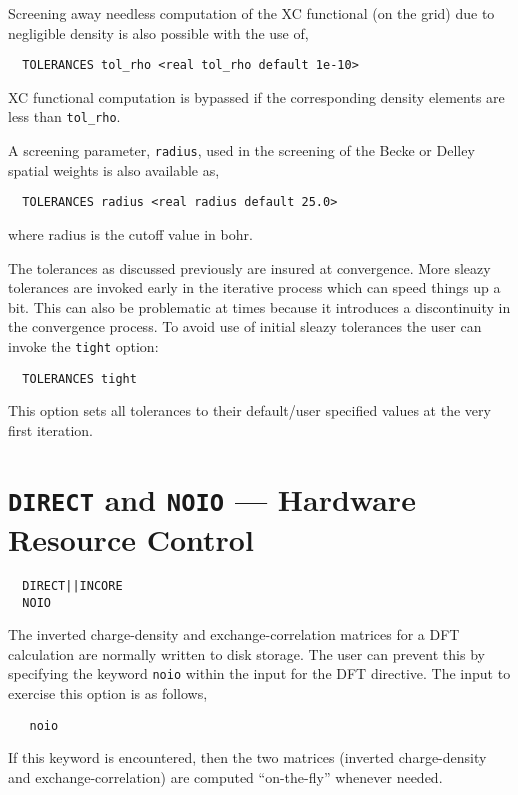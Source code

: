 
Screening away needless computation of the XC functional (on the grid)
due to negligible density is also possible with the use of,
\begin{verbatim}
  TOLERANCES tol_rho <real tol_rho default 1e-10>
\end{verbatim}
XC functional computation is bypassed if the corresponding density
elements are less than \verb+tol_rho+.

A screening parameter, \verb+radius+, used in the screening of the
Becke or Delley spatial weights is also available as,
\begin{verbatim}
  TOLERANCES radius <real radius default 25.0>
\end{verbatim}
where radius is the cutoff value in bohr.

The tolerances as discussed previously are insured at convergence.
More sleazy tolerances are invoked early in the iterative process
which can speed things up a bit.  This can also be problematic at
times because it introduces a discontinuity in the convergence
process.  To avoid use of initial sleazy tolerances the user can
invoke the \verb+tight+ option:

\begin{verbatim}
  TOLERANCES tight 
\end{verbatim}

This option sets all tolerances to their
default/user specified values at the very first iteration.


\section{{\tt DIRECT} and {\tt NOIO} --- Hardware Resource Control}
\begin{verbatim}
  DIRECT||INCORE
  NOIO
\end{verbatim}

\sloppy

The inverted charge-density and exchange-correlation matrices
for a DFT calculation are normally written to disk storage.  The user
can prevent this by specifying the keyword \verb+noio+ within the
input for the DFT directive.  The input to exercise this option is
as follows,
\begin{verbatim}
   noio
\end{verbatim}
If this keyword is encountered, then the two matrices (inverted
charge-density and exchange-correlation) are computed ``on-the-fly''
whenever needed.  

